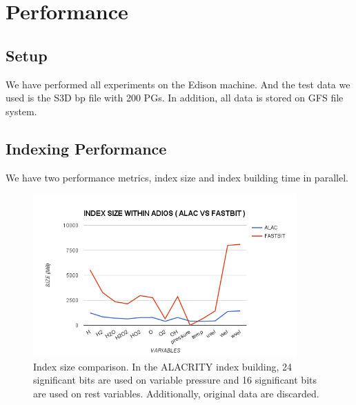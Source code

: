 \documentclass[11pt,a4paper]{article}
\begin{document}
\section{Performance}

\subsection{Setup}
We have performed all experiments on the Edison machine. 
And the test data we used is the S3D bp file with 200 PGs. 
In addition, all data is stored on GFS file system.

\subsection{Indexing Performance}
We have two performance metrics, index size and index building time in parallel. 



\begin{figure}[ht]             
\begin{center}                 
    \includegraphics[width=0.90\textwidth]{figures/perf/alac-adios/idx-size-comp}
\end{center}
\caption{Index size comparison. In the ALACRITY index building, 24 significant bits are used on variable pressure and 16 significant bits are used on rest variables. Additionally, original data are discarded.  }
\label{fig:idx-size}  
\end{figure}
\end{document}
